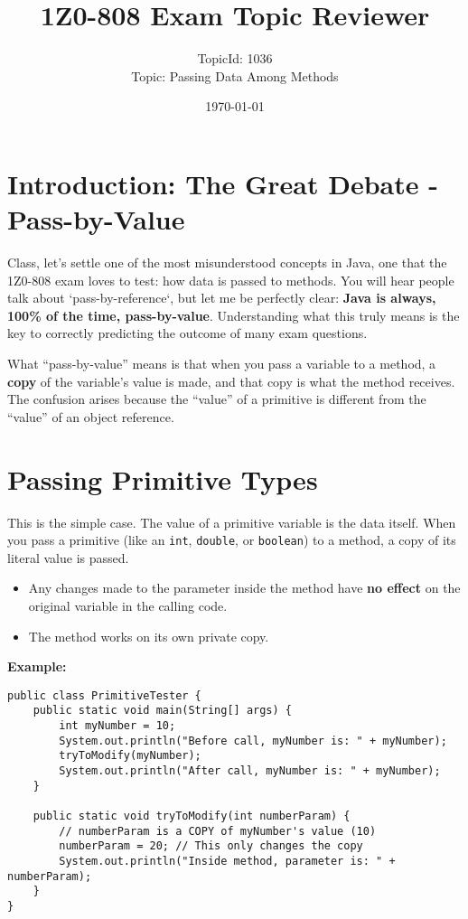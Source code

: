 \documentclass[12pt]{article}
\title{\textbf{1Z0-808 Exam Topic Reviewer}}
\author{TopicId: 1036 \\ Topic: Passing Data Among Methods}
\date{\today}
\begin{document}
\maketitle
\newpage\begin{enumerate}[label=(\arabic*)]
\section*{Introduction: The Great Debate - Pass-by-Value}
Class, let's settle one of the most misunderstood concepts in Java, one that the 1Z0-808 exam loves to test: how data is passed to methods. You will hear people talk about `pass-by-reference`, but let me be perfectly clear: \textbf{Java is always, 100\% of the time, pass-by-value}. Understanding what this truly means is the key to correctly predicting the outcome of many exam questions.

What ``pass-by-value'' means is that when you pass a variable to a method, a \textbf{copy} of the variable's value is made, and that copy is what the method receives.
The confusion arises because the ``value'' of a primitive is different from the ``value'' of an object reference.

\section{Passing Primitive Types}
This is the simple case. The value of a primitive variable is the data itself.
When you pass a primitive (like an \texttt{int}, \texttt{double}, or \texttt{boolean}) to a method, a copy of its literal value is passed.

\begin{itemize}
    \item Any changes made to the parameter inside the method have \textbf{no effect} on the original variable in the calling code.
    \item The method works on its own private copy.
\end{itemize}

\textbf{Example:}
\begin{verbatim}
public class PrimitiveTester {
    public static void main(String[] args) {
        int myNumber = 10;
        System.out.println("Before call, myNumber is: " + myNumber);
        tryToModify(myNumber);
        System.out.println("After call, myNumber is: " + myNumber);
    }

    public static void tryToModify(int numberParam) {
        // numberParam is a COPY of myNumber's value (10)
        numberParam = 20; // This only changes the copy
        System.out.println("Inside method, parameter is: " + numberParam);
    }
}
\end{verbatim}


\end{enumerate}
\end{document}
